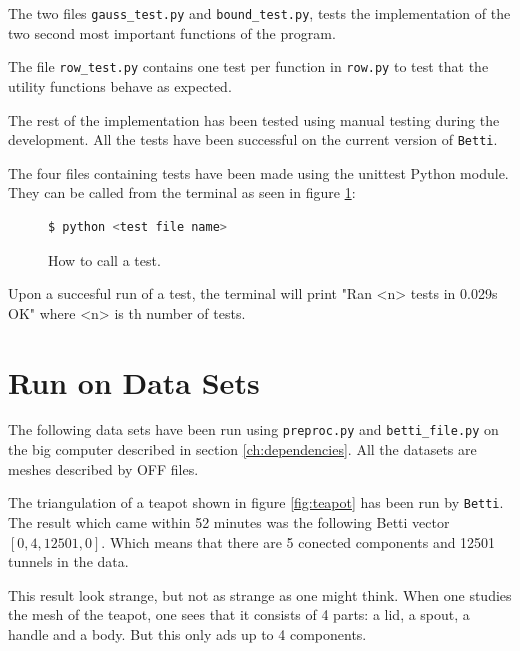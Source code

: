 \documentclass[11pt,a4paper,twoside]{report}
\begin{document}
The two files \texttt{gauss\_test.py} and \texttt{bound\_test.py}, tests the implementation of the two second most important functions of the program.

The file \texttt{row\_test.py} contains one test per function in \texttt{row.py} to test that the utility functions behave as expected.

The rest of the implementation has been tested using manual testing during the development. All the tests have been successful on the current version of \texttt{Betti}.

The four files containing tests have been made using the unittest Python module. They can be called from the terminal as seen in figure \ref{fig:how2test}:
\begin{figure}[H]
\begin{lstlisting}[language=bash]
$ python <test file name>
\end{lstlisting}
\caption{How to call a test.}
\label{fig:how2test}
\end{figure}
Upon a succesful run of a test, the terminal will print "Ran <n> tests in 0.029s OK" where <n> is th number of tests.

\section{Run on Data Sets}\label{ch:test_data}
The following data sets have been run using \texttt{preproc.py} and \texttt{betti\_file.py} on the big computer described in section \ref{ch:dependencies}. All the datasets are meshes described by OFF files. 

The triangulation of a teapot shown in figure \ref{fig:teapot} has been run by \texttt{Betti}. The result which came within 52 minutes was the following Betti vector $[0,4,12501,0]$. Which means that there are 5 conected components and 12501 tunnels in the data.

This result look strange, but not as strange as one might think. When one studies the mesh of the teapot, one sees that it consists of 4 parts: a lid, a spout, a handle and a body. But this only ads up to 4 components.
\end{document}
